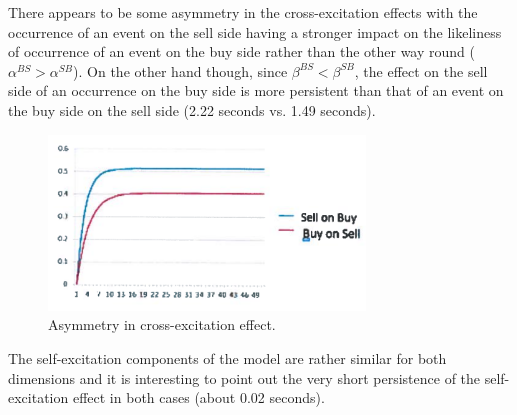 	
There appears to be some asymmetry in the cross-excitation effects with the occurrence of an event on the sell side having a stronger impact on the likeliness of occurrence of an event on the buy side rather than the other way round ($\alpha^{BS}>\alpha^{SB}$). On the other hand though, since $\beta^{BS}<\beta^{SB}$, the effect on the sell side of an occurrence on the buy side is more persistent than that of an event on the buy side on the sell side (2.22 seconds vs. 1.49 seconds).
	\begin{figure}[!ht]
   	\centering
   	\includegraphics[width=0.75\textwidth]{chapters/chapter_el_exch/figures/asymcross.png} 
   	\caption{Asymmetry in cross-excitation effect. \label{fig:asymcross}}
	\end{figure}
The self-excitation components of the model are rather similar for both dimensions and it is interesting to point out the very short persistence of the self-excitation effect in both cases (about 0.02 seconds).


